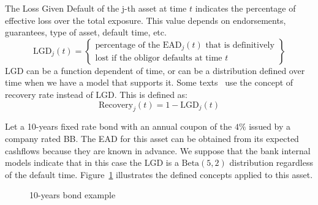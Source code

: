 \documentclass[11pt,fleqn]{book} %
\begin{document}
\begin{definition}
	The Loss Given Default of the j-th asset at time $t$ indicates 
	the percentage of effective loss over the total exposure. This
	value depends on endorsements, guarantees, type of asset, 
	default time, etc.
	\begin{displaymath}
		\text{LGD}_j(t) = \left\{
		\begin{array}{c}
			\text{percentage of the $\text{EAD}_j(t)$ that is definitively} \\
			\text{lost if the obligor defaults at time $t$}
		\end{array}
		\right\}
	\end{displaymath}
	LGD can be a function dependent of time, or can be a distribution
	defined over time when we have a model that supports it. 
	Some texts~\cite{creditrisk+:1997} use the concept of recovery rate
	instead of LGD\@. This is defined as:
	\begin{displaymath}
		\text{Recovery}_j(t) = 1- \text{LGD}_j(t)
	\end{displaymath}
\end{definition}

\begin{example}
	Let a 10-years fixed rate bond with an annual coupon of the
	$4\%$ issued by a company rated BB\@.
	The EAD for this asset can be obtained from its expected cashflows 
	because they are known in advance. We suppose that the bank 
	internal models indicate that in this case the LGD is a 
	$\text{Beta}(5,2)$ distribution regardless of the default time.
	Figure~\ref{figure:bond} illustrates the defined concepts applied 
	to this asset.
	\begin{figure}[!ht]
		\centering
		\caption{10-years bond example}
		\label{figure:bond} 
	\end{figure}
\end{example}
\end{document}
